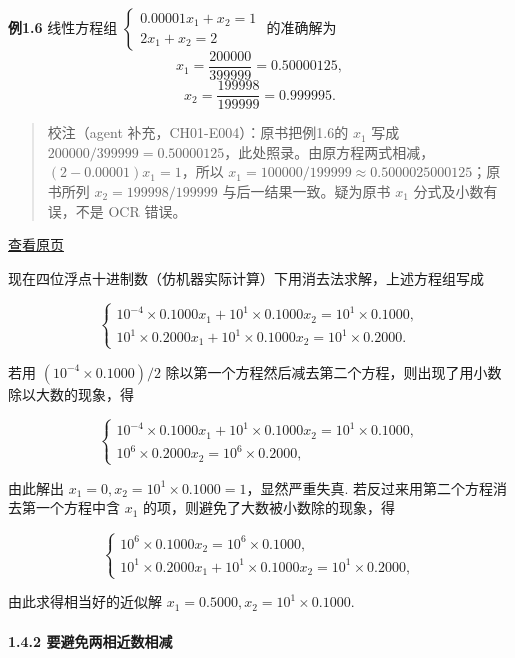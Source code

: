 \documentclass[
  10pt,
  fontset=fandol]{ctexart}
\begin{document}
\textbf{例1.6} 线性方程组 \(\begin{cases} 0.00001x_1 + x_2 = 1 \\ 2x_1 + x_2 = 2 \end{cases}\) 的准确解为 \[
x_1 = \frac{200000}{399999} = 0.50000125,
\] \[
x_2 = \frac{199998}{199999} = 0.999995.
\]

\begin{quote}
校注（agent 补充，CH01-E004）：原书把例1.6的 \(x_1\) 写成 \(200000/399999=0.50000125\)，此处照录。由原方程两式相减，\((2-0.00001)x_1=1\)，所以 \(x_1=100000/199999\approx0.5000025000125\)；原书所列 \(x_2=199998/199999\) 与后一结果一致。疑为原书 \(x_1\) 分式及小数有误，不是 OCR 错误。
\end{quote}

\href{../../source-images/pdf-023.jpeg}{查看原页}

现在四位浮点十进制数（仿机器实际计算）下用消去法求解，上述方程组写成

\[
\begin{cases} 10^{-4} \times 0.1000x_1 + 10^1 \times 0.1000x_2 = 10^1 \times 0.1000, \\ 10^1 \times 0.2000x_1 + 10^1 \times 0.1000x_2 = 10^1 \times 0.2000. \end{cases}
\]

若用 \((10^{-4} \times 0.1000)/2\) 除以第一个方程然后减去第二个方程，则出现了用小数除以大数的现象，得

\[
\begin{cases} 10^{-4} \times 0.1000x_1 + 10^1 \times 0.1000x_2 = 10^1 \times 0.1000, \\ 10^6 \times 0.2000x_2 = 10^6 \times 0.2000, \end{cases}
\]

由此解出 \(x_1=0, x_2=10^1 \times 0.1000=1\)，显然严重失真. 若反过来用第二个方程消去第一个方程中含 \(x_1\) 的项，则避免了大数被小数除的现象，得

\[
\begin{cases} 10^6 \times 0.1000x_2 = 10^6 \times 0.1000, \\ 10^1 \times 0.2000x_1 + 10^1 \times 0.1000x_2 = 10^1 \times 0.2000, \end{cases}
\]

由此求得相当好的近似解 \(x_1=0.5000, x_2=10^1 \times 0.1000\).

\paragraph{1.4.2 要避免两相近数相减}\label{ux8981ux907fux514dux4e24ux76f8ux8fd1ux6570ux76f8ux51cf}
\end{document}
